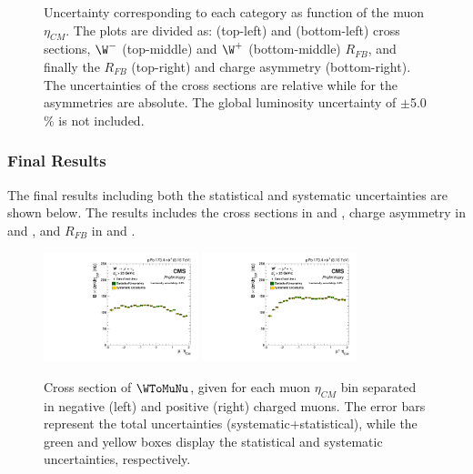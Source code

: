 \begin{figure}[!htbp]
\begin{center}
 \end{center}
 \caption{Uncertainty corresponding to each category as function of the muon $\eta_{CM}$. The plots are divided as: \WToMuNuMi (top-left) and \WToMuNuPl (bottom-left) cross sections, $\W^{-}$ (top-middle) and $\W^{+}$ (bottom-middle) $R_{FB}$, and finally the \W $R_{FB}$ (top-right) and \W charge asymmetry (bottom-right). The uncertainties of the cross sections are relative while for the asymmetries are absolute. The global luminosity uncertainty of $\pm$5.0$\%$ is not included.}
 \label{fig:Summary_Systematics}
\end{figure}


\clearpage
\subsubsection{Final Results}\label{sec:WBoson_Analysis_FinalResults}

The final results including both the statistical and systematic uncertainties are shown below. The results includes the \W cross sections in  and  , \W charge asymmetry in  and , and \W $R_{FB}$ in  and .

\begin{figure}[!htbp]
 \begin{center}
  \includegraphics[width=0.40\textwidth]{Figures/WBoson/Analysis/Systematics/Nominal/PA/Cross_Section/gr_WToMuMi_PA_Cross_Section_EffTnP_Nominal.pdf}
  \includegraphics[width=0.40\textwidth]{Figures/WBoson/Analysis/Systematics/Nominal/PA/Cross_Section/gr_WToMuPl_PA_Cross_Section_EffTnP_Nominal.pdf}
 \end{center}
 \caption{Cross section of $\WToMuNu$, given for each muon $\eta_{CM}$ bin separated in negative (left) and positive (right) charged muons. The error bars represent the total uncertainties (systematic+statistical), while the green and yellow boxes display the statistical and systematic uncertainties, respectively. }
 \label{fig:CrossSectionSyst_WToMu_PA}
\end{figure}


